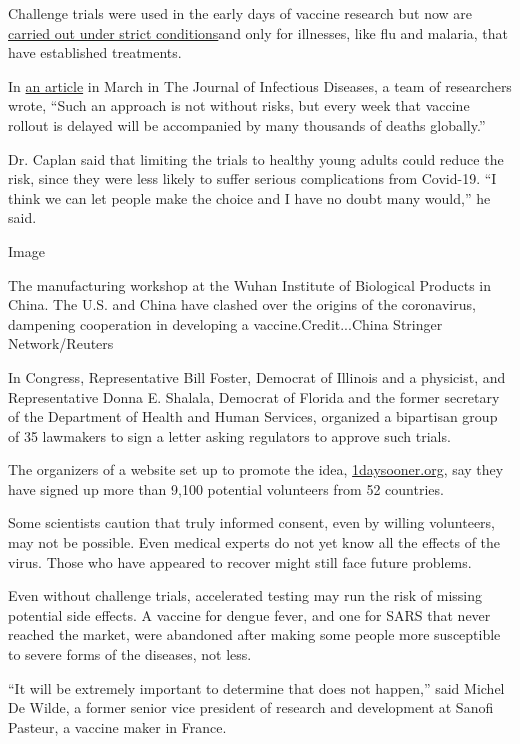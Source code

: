 Challenge trials were used in the early days of vaccine research but now
are
\href{https://www.nytimes3xbfgragh.onion/2020/04/30/opinion/coronavirus-vaccine-covid.html}{carried
out under strict conditions}and only for illnesses, like flu and
malaria, that have established treatments.

In
\href{https://dash.harvard.edu/bitstream/handle/1/42639016/jiaa152.pdf?sequence=4\&isAllowed=y}{an
article} in March in The Journal of Infectious Diseases, a team of
researchers wrote, ``Such an approach is not without risks, but every
week that vaccine rollout is delayed will be accompanied by many
thousands of deaths globally.''

Dr. Caplan said that limiting the trials to healthy young adults could
reduce the risk, since they were less likely to suffer serious
complications from Covid-19. ``I think we can let people make the choice
and I have no doubt many would,'' he said.

Image

The manufacturing workshop at the Wuhan Institute of Biological Products
in China. The U.S. and China have clashed over the origins of the
coronavirus, dampening cooperation in developing a
vaccine.Credit...China Stringer Network/Reuters

In Congress, Representative Bill Foster, Democrat of Illinois and a
physicist, and Representative Donna E. Shalala, Democrat of Florida and
the former secretary of the Department of Health and Human Services,
organized a bipartisan group of 35 lawmakers to sign a letter asking
regulators to approve such trials.

The organizers of a website set up to promote the idea,
\href{https://1daysooner.org/}{1daysooner.org}, say they have signed up
more than 9,100 potential volunteers from 52 countries.

Some scientists caution that truly informed consent, even by willing
volunteers, may not be possible. Even medical experts do not yet know
all the effects of the virus. Those who have appeared to recover might
still face future problems.

Even without challenge trials, accelerated testing may run the risk of
missing potential side effects. A vaccine for dengue fever, and one for
SARS that never reached the market, were abandoned after making some
people more susceptible to severe forms of the diseases, not less.

``It will be extremely important to determine that does not happen,''
said Michel De Wilde, a former senior vice president of research and
development at Sanofi Pasteur, a vaccine maker in France.

